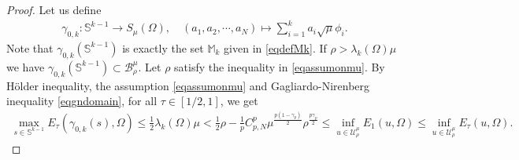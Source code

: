 \documentclass[10pt,a4paper]{article}
\theoremstyle{definition} \theoremstyle{remark}
\numberwithin{equation}{section}
\newcommand{\B}{\mathcal{B}}
\newcommand{\U}{\mathcal{U}}
\newcommand{\s}{\mathbb{S}}
\newcommand{\la}{\lambda}
\newcommand{\ga}{\gamma}
\begin{document}
\begin{proof}
	Let us define
	\begin{align*}
		\gamma_{0,k}: \s^{k-1} \to S_\mu(\Omega), \quad  (a_1,a_2,\cdots,a_N) \mapsto \sum_{i=1}^ka_i\sqrt{\mu}\phi_i.
	\end{align*}
	Note that $\gamma_{0,k}(\s^{k-1})$ is exactly the set $\mathbb{M}_k$ given in \eqref{eqdefMk}. If $\rho > \la_k(\Omega)\mu$ we have $\gamma_{0,k}(\s^{k-1}) \subset \B_\rho^\mu$. Let $\rho$ satisfy the inequality in \eqref{eqassumonmu}. By H\"older inequality, the assumption \eqref{eqassumonmu} and Gagliardo-Nirenberg inequality \eqref{eqgndomain}, for all $\tau \in [1/2,1]$, we get
	\begin{align} \label{eqmaxsn-1}
		\max_{s \in \s^{k-1}}E_\tau(\gamma_{0,k}(s),\Omega)  \leq \frac12 \la_k(\Omega)\mu < \frac12 \rho - \frac1p C_{p,N}^p \mu^{\frac{p(1-\ga_p)}{2}}\rho ^{\frac{p\ga_p}{2}} \leq \inf_{u \in \U_\rho^\mu}E_1(u,\Omega) \le \inf_{u \in \U_\rho^\mu}E_\tau(u,\Omega).
	\end{align}
	

\end{proof}
\end{document}
